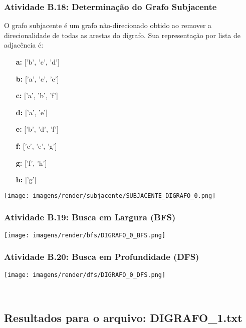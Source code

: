 \documentclass[a4paper,12pt]{article}
\begin{document}
\subsubsection*{Atividade B.18: Determinação do Grafo Subjacente}
O grafo subjacente é um grafo não-direcionado obtido ao remover a direcionalidade de todas as arestas do dígrafo. Sua representação por lista de adjacência é:
\begin{itemize}[leftmargin=*]
    \item[\textbf{a:}] ['b', 'c', 'd']
    \item[\textbf{b:}] ['a', 'c', 'e']
    \item[\textbf{c:}] ['a', 'b', 'f']
    \item[\textbf{d:}] ['a', 'e']
    \item[\textbf{e:}] ['b', 'd', 'f']
    \item[\textbf{f:}] ['c', 'e', 'g']
    \item[\textbf{g:}] ['f', 'h']
    \item[\textbf{h:}] ['g']
\end{itemize}

\begin{center}
    \texttt{[image: imagens/render/subjacente/SUBJACENTE\_DIGRAFO\_0.png]}
\end{center}


\subsubsection*{Atividade B.19: Busca em Largura (BFS)}
\begin{center}
    \texttt{[image: imagens/render/bfs/DIGRAFO\_0\_BFS.png]}
\end{center}

\subsubsection*{Atividade B.20: Busca em Profundidade (DFS)}
\begin{center}
    \texttt{[image: imagens/render/dfs/DIGRAFO\_0\_DFS.png]}
\end{center}
\\
\subsection{Resultados para o arquivo: DIGRAFO\_1.txt}
\end{document}
